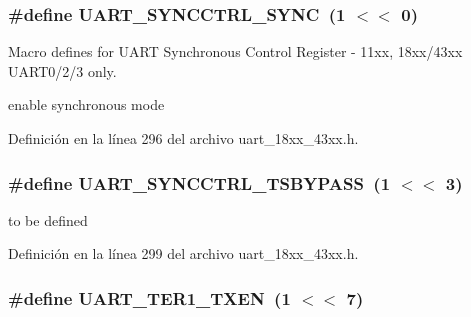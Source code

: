 \subsubsection[{\texorpdfstring{U\+A\+R\+T\+\_\+\+S\+Y\+N\+C\+C\+T\+R\+L\+\_\+\+S\+Y\+NC}{UART_SYNCCTRL_SYNC}}]{\setlength{\rightskip}{0pt plus 5cm}\#define U\+A\+R\+T\+\_\+\+S\+Y\+N\+C\+C\+T\+R\+L\+\_\+\+S\+Y\+NC~(1 $<$$<$ 0)}\hypertarget{group___u_a_r_t__18_x_x__43_x_x_ga03c124f3fc8b888e5ee5a3fc7660bb7d}{}\label{group___u_a_r_t__18_x_x__43_x_x_ga03c124f3fc8b888e5ee5a3fc7660bb7d}


Macro defines for U\+A\+RT Synchronous Control Register -\/ 11xx, 18xx/43xx U\+A\+R\+T0/2/3 only. 

enable synchronous mode 

Definición en la línea 296 del archivo uart\+\_\+18xx\+\_\+43xx.\+h.

\subsubsection[{\texorpdfstring{U\+A\+R\+T\+\_\+\+S\+Y\+N\+C\+C\+T\+R\+L\+\_\+\+T\+S\+B\+Y\+P\+A\+SS}{UART_SYNCCTRL_TSBYPASS}}]{\setlength{\rightskip}{0pt plus 5cm}\#define U\+A\+R\+T\+\_\+\+S\+Y\+N\+C\+C\+T\+R\+L\+\_\+\+T\+S\+B\+Y\+P\+A\+SS~(1 $<$$<$ 3)}\hypertarget{group___u_a_r_t__18_x_x__43_x_x_gaea12c85ea0d6a9fa91242904c707a285}{}\label{group___u_a_r_t__18_x_x__43_x_x_gaea12c85ea0d6a9fa91242904c707a285}
to be defined 

Definición en la línea 299 del archivo uart\+\_\+18xx\+\_\+43xx.\+h.

\subsubsection[{\texorpdfstring{U\+A\+R\+T\+\_\+\+T\+E\+R1\+\_\+\+T\+X\+EN}{UART_TER1_TXEN}}]{\setlength{\rightskip}{0pt plus 5cm}\#define U\+A\+R\+T\+\_\+\+T\+E\+R1\+\_\+\+T\+X\+EN~(1 $<$$<$ 7)}\hypertarget{group___u_a_r_t__18_x_x__43_x_x_ga78f0ee43aa0e7c030a3cfa1dca5ff072}{}\label{group___u_a_r_t__18_x_x__43_x_x_ga78f0ee43aa0e7c030a3cfa1dca5ff072}


